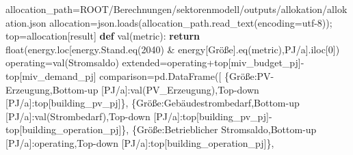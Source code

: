 \documentclass[
  ngerman,
  a4paper,
  DIV=11]{scrreprt}
\newenvironment{Shaded}{\begin{snugshade}}{\end{snugshade}}
\newcommand{\BuiltInTok}[1]{\textcolor[rgb]{0.00,0.23,0.31}{#1}}
\newcommand{\ControlFlowTok}[1]{\textcolor[rgb]{0.00,0.23,0.31}{\textbf{#1}}}
\newcommand{\DecValTok}[1]{\textcolor[rgb]{0.68,0.00,0.00}{#1}}
\newcommand{\KeywordTok}[1]{\textcolor[rgb]{0.00,0.23,0.31}{\textbf{#1}}}
\newcommand{\NormalTok}[1]{\textcolor[rgb]{0.00,0.23,0.31}{#1}}
\newcommand{\OperatorTok}[1]{\textcolor[rgb]{0.37,0.37,0.37}{#1}}
\newcommand{\StringTok}[1]{\textcolor[rgb]{0.13,0.47,0.30}{#1}}
\begin{document}
\begin{Shaded}
\begin{Highlighting}[]
\NormalTok{allocation\_path}\OperatorTok{=}\NormalTok{ROOT}\OperatorTok{/}\StringTok{\textquotesingle{}Berechnungen/sektorenmodell/outputs/allokation/allokation.json\textquotesingle{}}
\NormalTok{allocation}\OperatorTok{=}\NormalTok{json.loads(allocation\_path.read\_text(encoding}\OperatorTok{=}\StringTok{\textquotesingle{}utf{-}8\textquotesingle{}}\NormalTok{))}\OperatorTok{;}\NormalTok{ top}\OperatorTok{=}\NormalTok{allocation[}\StringTok{\textquotesingle{}result\textquotesingle{}}\NormalTok{]}
\KeywordTok{def}\NormalTok{ val(metric):}
    \ControlFlowTok{return} \BuiltInTok{float}\NormalTok{(energy.loc[energy.Stand.eq(}\StringTok{\textquotesingle{}2040\textquotesingle{}}\NormalTok{) }\OperatorTok{\&}\NormalTok{ energy[}\StringTok{\textquotesingle{}Größe\textquotesingle{}}\NormalTok{].eq(metric),}\StringTok{\textquotesingle{}PJ/a\textquotesingle{}}\NormalTok{].iloc[}\DecValTok{0}\NormalTok{])}
\NormalTok{operating}\OperatorTok{=}\NormalTok{val(}\StringTok{\textquotesingle{}Stromsaldo\textquotesingle{}}\NormalTok{)}
\NormalTok{extended}\OperatorTok{=}\NormalTok{operating}\OperatorTok{+}\NormalTok{top[}\StringTok{\textquotesingle{}miv\_budget\_pj\textquotesingle{}}\NormalTok{]}\OperatorTok{{-}}\NormalTok{top[}\StringTok{\textquotesingle{}miv\_demand\_pj\textquotesingle{}}\NormalTok{]}
\NormalTok{comparison}\OperatorTok{=}\NormalTok{pd.DataFrame([}
\NormalTok{ \{}\StringTok{\textquotesingle{}Größe\textquotesingle{}}\NormalTok{:}\StringTok{\textquotesingle{}PV{-}Erzeugung\textquotesingle{}}\NormalTok{,}\StringTok{\textquotesingle{}Bottom{-}up [PJ/a]\textquotesingle{}}\NormalTok{:val(}\StringTok{\textquotesingle{}PV\_Erzeugung\textquotesingle{}}\NormalTok{),}\StringTok{\textquotesingle{}Top{-}down [PJ/a]\textquotesingle{}}\NormalTok{:top[}\StringTok{\textquotesingle{}building\_pv\_pj\textquotesingle{}}\NormalTok{]\},}
\NormalTok{ \{}\StringTok{\textquotesingle{}Größe\textquotesingle{}}\NormalTok{:}\StringTok{\textquotesingle{}Gebäudestrombedarf\textquotesingle{}}\NormalTok{,}\StringTok{\textquotesingle{}Bottom{-}up [PJ/a]\textquotesingle{}}\NormalTok{:val(}\StringTok{\textquotesingle{}Strombedarf\textquotesingle{}}\NormalTok{),}\StringTok{\textquotesingle{}Top{-}down [PJ/a]\textquotesingle{}}\NormalTok{:top[}\StringTok{\textquotesingle{}building\_pv\_pj\textquotesingle{}}\NormalTok{]}\OperatorTok{{-}}\NormalTok{top[}\StringTok{\textquotesingle{}building\_operation\_pj\textquotesingle{}}\NormalTok{]\},}
\NormalTok{ \{}\StringTok{\textquotesingle{}Größe\textquotesingle{}}\NormalTok{:}\StringTok{\textquotesingle{}Betrieblicher Stromsaldo\textquotesingle{}}\NormalTok{,}\StringTok{\textquotesingle{}Bottom{-}up [PJ/a]\textquotesingle{}}\NormalTok{:operating,}\StringTok{\textquotesingle{}Top{-}down [PJ/a]\textquotesingle{}}\NormalTok{:top[}\StringTok{\textquotesingle{}building\_operation\_pj\textquotesingle{}}\NormalTok{]\},}

\end{Highlighting}
\end{Shaded}
\end{document}

